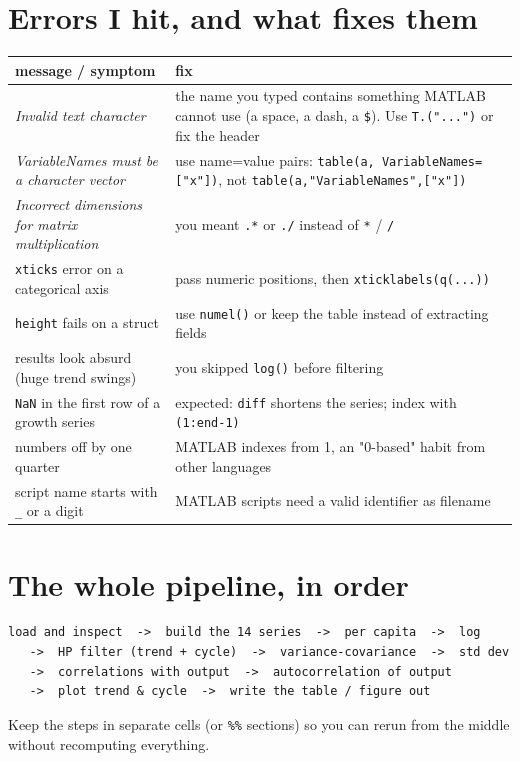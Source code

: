\documentclass[11pt]{article}
\begin{document}
\section{Errors I hit, and what fixes them}

{\footnotesize
\begin{center}
\begin{tabular}{@{}>{\raggedright\arraybackslash}p{6.6cm}>{\raggedright\arraybackslash}p{9.9cm}@{}}
\toprule
message / symptom & fix \\
\midrule
\emph{Invalid text character} & the name you typed contains something MATLAB cannot use (a space, a dash, a \texttt{\$}). Use \texttt{T.("...")} or fix the header \\
\emph{VariableNames must be a character vector} & use name=value pairs: \texttt{table(a, VariableNames=["x"])}, not \texttt{table(a,"VariableNames",["x"])} \\
\emph{Incorrect dimensions for matrix multiplication} & you meant \texttt{.*} or \texttt{./} instead of \texttt{*} / \texttt{/} \\
\texttt{xticks} error on a categorical axis & pass numeric positions, then \texttt{xticklabels(q(...))} \\
\texttt{height} fails on a struct & use \texttt{numel()} or keep the table instead of extracting fields \\
results look absurd (huge trend swings) & you skipped \texttt{log()} before filtering \\
\texttt{NaN} in the first row of a growth series & expected: \texttt{diff} shortens the series; index with \texttt{(1:end-1)} \\
numbers off by one quarter & MATLAB indexes from 1, an "0-based" habit from other languages \\
script name starts with \texttt{\_} or a digit & MATLAB scripts need a valid identifier as filename \\
\bottomrule
\end{tabular}
\end{center}}

\section{The whole pipeline, in order}

\begin{lstlisting}
load and inspect  ->  build the 14 series  ->  per capita  ->  log
   ->  HP filter (trend + cycle)  ->  variance-covariance  ->  std dev
   ->  correlations with output  ->  autocorrelation of output
   ->  plot trend & cycle  ->  write the table / figure out
\end{lstlisting}

Keep the steps in separate cells (or \lstinline[style=inl]!%%! sections) so you can rerun from
the middle without recomputing everything.
\end{document}
